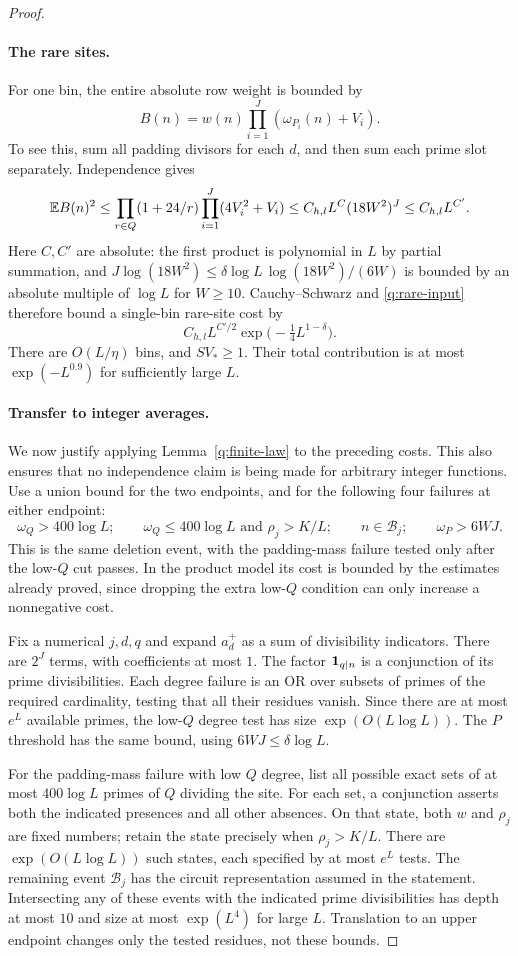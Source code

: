 \begin{proof}
\paragraph{The rare sites.}
For one bin, the entire absolute row weight is bounded by
\[
 B(n)=w(n)\prod_{i=1}^J(\omega_{P_i}(n)+V_i).
\]
To see this, sum all padding divisors for each $d$, and then sum each
prime slot separately.  Independence gives
\[
 \mathbb E B(n)^2
 \le\prod_{r\in Q}(1+24/r)
       \prod_{i=1}^J(4V_i^2+V_i)
 \le C_{h,l}L^{C}(18W^2)^J
 \le C_{h,l}L^{C'}.
\]
Here $C,C'$ are absolute: the first product is polynomial in $L$ by
partial summation, and
$J\log(18W^2)\le\delta\log L\,\log(18W^2)/(6W)$ is bounded by an
absolute multiple of $\log L$ for $W\ge10$.
Cauchy--Schwarz and \eqref{q:rare-input} therefore bound a single-bin
rare-site cost by
\[
 C_{h,l}L^{C'/2}\exp\bigl(-\tfrac14L^{1-\delta}\bigr).
\]
There are $O(L/\eta)$ bins, and $SV_*\ge1$.
Their total contribution is at most $\exp(-L^{0.9})$ for sufficiently
large $L$.

\paragraph{Transfer to integer averages.}
We now justify applying Lemma~\ref{q:finite-law} to the preceding costs.
This also ensures that no independence claim is being made for arbitrary
integer functions.  Use a union bound for the two endpoints, and for
the following four failures at either endpoint:
\[
 \omega_Q>400\log L;\qquad
 \omega_Q\le400\log L\text{ and }\rho_j>K/L;\qquad
 n\in\mathcal B_j;\qquad \omega_P>6WJ.
\]
This is the same deletion event, with the padding-mass failure tested
only after the low-$Q$ cut passes.  In the product model its cost is
bounded by the estimates already proved, since dropping the extra
low-$Q$ condition can only increase a nonnegative cost.

Fix a numerical $j,d,q$ and expand $a_d^+$ as a sum of divisibility
indicators.  There are $2^J$ terms, with coefficients at most $1$.
The factor $\mathbf 1_{q\mid n}$ is a conjunction of its prime divisibilities.
Each degree failure is an OR over subsets of primes of the required
cardinality, testing that all their residues vanish.  Since there are
at most $e^L$ available primes, the low-$Q$ degree test has size
$\exp(O(L\log L))$.  The $P$ threshold has the same bound, using
$6WJ\le\delta\log L$.

For the padding-mass failure with low $Q$ degree, list all possible exact
sets of at most $400\log L$ primes of $Q$ dividing the site.  For each
set, a conjunction asserts both the indicated presences and all other
absences.  On that state, both $w$ and $\rho_j$ are fixed numbers; retain
the state precisely when $\rho_j>K/L$.  There are
$\exp(O(L\log L))$ such states, each specified by at most $e^L$ tests.
The remaining event $\mathcal B_j$ has the circuit representation assumed
in the statement.  Intersecting any of these events with the indicated
prime divisibilities has depth at most $10$ and size at most
$\exp(L^4)$ for large $L$.  Translation to an upper endpoint changes
only the tested residues, not these bounds.


\end{proof}

